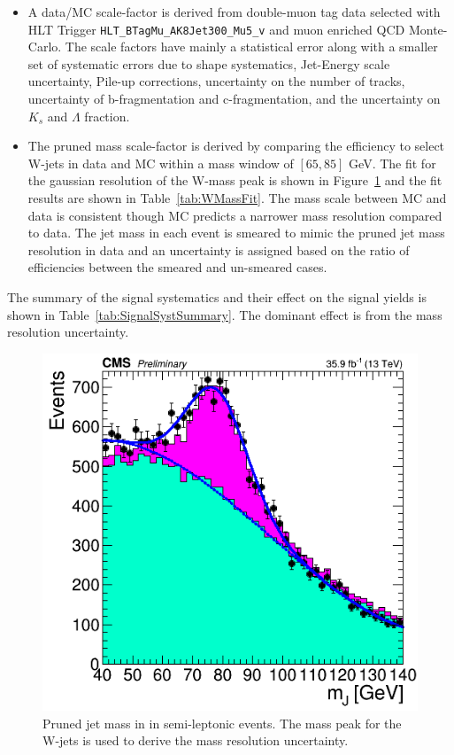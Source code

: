 \begin{itemize}
\item A data/MC scale-factor is derived from double-muon tag data selected with HLT Trigger \texttt{HLT\_BTagMu\_AK8Jet300\_Mu5\_v} and muon enriched QCD Monte-Carlo. The scale factors have mainly a statistical error along with a smaller set of systematic errors due to shape systematics, Jet-Energy scale uncertainty, Pile-up corrections, uncertainty on the number of tracks, uncertainty of b-fragmentation and  c-fragmentation, and the uncertainty on $K_{s}$ and $\Lambda$ fraction. 
\item The pruned mass scale-factor is derived by comparing the efficiency to select W-jets in data and MC within a mass window of $\left[65,85\right]$ GeV.  The fit for the gaussian resolution of the W-mass peak is shown in Figure~\ref{fig:WMassPeak} and the fit results are shown in Table~\ref{tab:WMassFit}. The mass scale between MC and data is consistent though MC predicts a narrower mass resolution compared to data. The jet mass in each event is smeared to mimic the pruned jet mass resolution in data and an uncertainty is assigned based on the ratio of efficiencies between the smeared and un-smeared cases. ~\cite{CMS_AN_2016-215}
\end{itemize} 

The summary of the signal systematics and their effect on the signal yields is shown in Table~\ref{tab:SignalSystSummary}. The dominant effect is from the mass resolution uncertainty.


\begin{figure}[hb!]
\begin{center}
\includegraphics[width=0.5\linewidth]{figs/WMassPeakDataMC.png}
\end{center}
\caption{Pruned jet mass in in semi-leptonic \ttbar events. The mass peak for the W-jets is used to derive the mass resolution uncertainty. }
\label{fig:WMassPeak}
\end{figure}

